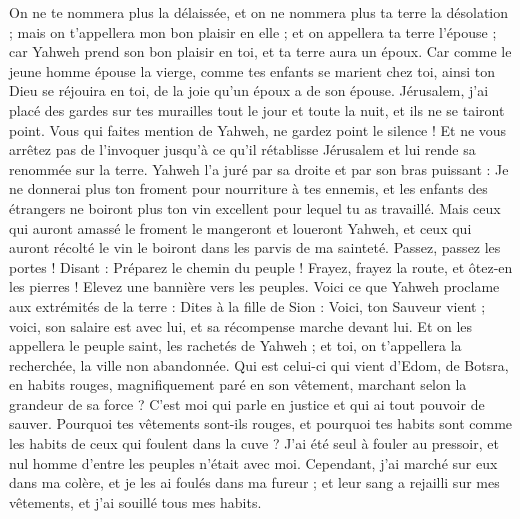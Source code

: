 \begin{multicols}{2}
On ne te nommera plus la délaissée, et on ne nommera plus ta terre la désolation ; mais on t'appellera mon bon plaisir en elle ; et on appellera ta terre l'épouse ; car Yahweh prend son bon plaisir en toi, et ta terre aura un époux.
Car comme le jeune homme épouse la vierge, comme tes enfants se marient chez toi, ainsi ton Dieu se réjouira en toi, de la joie qu'un époux a de son épouse.
Jérusalem, j'ai placé des gardes sur tes murailles tout le jour et toute la nuit, et ils ne se tairont point. Vous qui faites mention de Yahweh, ne gardez point le silence !
Et ne vous arrêtez pas de l'invoquer jusqu'à ce qu'il rétablisse Jérusalem et lui rende sa renommée sur la terre.
Yahweh l'a juré par sa droite et par son bras puissant : Je ne donnerai plus ton froment pour nourriture à tes ennemis, et les enfants des étrangers ne boiront plus ton vin excellent pour lequel tu as travaillé.
Mais ceux qui auront amassé le froment le mangeront et loueront Yahweh, et ceux qui auront récolté le vin le boiront dans les parvis de ma sainteté.
Passez, passez les portes ! Disant : Préparez le chemin du peuple ! Frayez, frayez la route, et ôtez-en les pierres ! Elevez une bannière vers les peuples.
Voici ce que Yahweh proclame aux extrémités de la terre : Dites à la fille de Sion : Voici, ton Sauveur vient ; voici, son salaire est avec lui, et sa récompense marche devant lui.
Et on les appellera le peuple saint, les rachetés de Yahweh ; et toi, on t'appellera la recherchée, la ville non abandonnée.
\VerseOne{}Qui est celui-ci qui vient d'Edom, de Botsra, en habits rouges, magnifiquement paré en son vêtement, marchant selon la grandeur de sa force ? C'est moi qui parle en justice et qui ai tout pouvoir de sauver.
Pourquoi tes vêtements sont-ils rouges, et pourquoi tes habits sont comme les habits de ceux qui foulent dans la cuve ?
J'ai été seul à fouler au pressoir, et nul homme d'entre les peuples n'était avec moi. Cependant, j'ai marché sur eux dans ma colère, et je les ai foulés dans ma fureur ; et leur sang a rejailli sur mes vêtements, et j'ai souillé tous mes habits.

\end{multicols}
